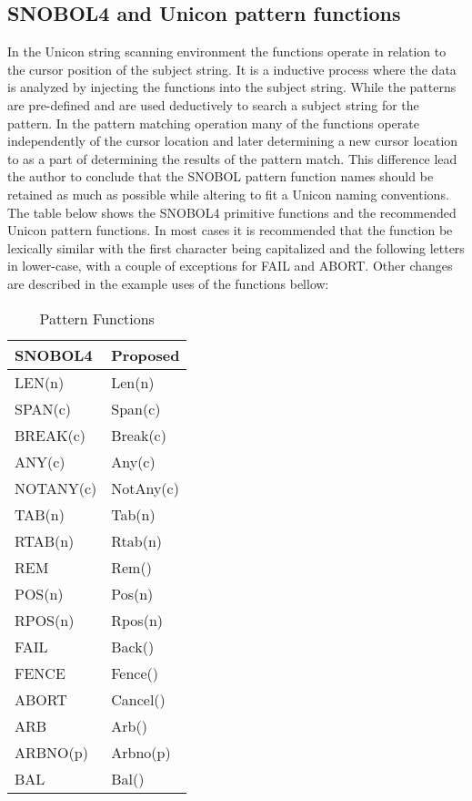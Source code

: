 \documentclass{article}
\begin{document}
\subsection{SNOBOL4 and Unicon pattern functions}

In the Unicon string scanning environment the functions operate in relation to the cursor position of the subject string.  It is a inductive process where the data is analyzed by injecting the functions into the subject string.  While the patterns are pre-defined and are used deductively to search a subject string for the pattern.  In the pattern matching operation many of the functions operate independently of the cursor location and later determining a new cursor location to as a part of determining the results of the pattern match.  This difference lead the author to conclude that the SNOBOL pattern function names should be retained as much as possible while altering to fit a Unicon naming conventions.  The table below shows the SNOBOL4 primitive functions and the recommended Unicon pattern functions.  In most cases it is recommended that the function be lexically similar with the first character being capitalized and the following letters in lower-case, with a couple of exceptions for FAIL and ABORT.  Other changes are described in the example uses of the functions bellow: 

\begin{table}[ht]
	\caption{Pattern Functions}
	\centering
	\begin{tabular}{|l|l|}
		\hline\hline
		SNOBOL4 & Proposed \\
		\hline
		LEN(n) & Len(n) \\
		SPAN(c) & Span(c)  \\
		BREAK(c) & Break(c) \\
		ANY(c) & Any(c) \\
		NOTANY(c) & NotAny(c) \\
		TAB(n) & Tab(n) \\
		RTAB(n) & Rtab(n) \\
		REM & Rem() \\
		POS(n) & Pos(n)  \\
		RPOS(n) & Rpos(n)  \\
		FAIL & Back() \\
		FENCE & Fence() \\
		ABORT & Cancel() \\
		ARB & Arb() \\
		ARBNO(p) & Arbno(p) \\
		BAL & Bal() \\
		\hline
	\end{tabular}
\end{table}
\end{document}
